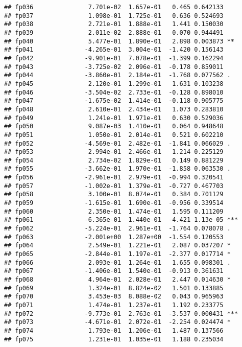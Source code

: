 \documentclass[
]{article}
\begin{document}
\begin{verbatim}
## fp036               7.701e-02  1.657e-01   0.465 0.642133    
## fp037               1.098e-01  1.725e-01   0.636 0.524693    
## fp038               2.721e-01  1.888e-01   1.441 0.150030    
## fp039               2.011e-02  2.888e-01   0.070 0.944491    
## fp040               5.477e-01  1.890e-01   2.898 0.003873 ** 
## fp041              -4.265e-01  3.004e-01  -1.420 0.156143    
## fp042              -9.901e-01  7.078e-01  -1.399 0.162294    
## fp043              -3.725e-02  2.096e-01  -0.178 0.859011    
## fp044              -3.860e-01  2.184e-01  -1.768 0.077562 .  
## fp045               2.120e-01  1.299e-01   1.631 0.103238    
## fp046              -3.504e-02  2.733e-01  -0.128 0.898010    
## fp047              -1.675e-02  1.414e-01  -0.118 0.905775    
## fp048               2.610e-01  2.434e-01   1.073 0.283810    
## fp049               1.241e-01  1.971e-01   0.630 0.529036    
## fp050               9.087e-03  1.410e-01   0.064 0.948648    
## fp051               1.050e-01  2.014e-01   0.521 0.602210    
## fp052              -4.569e-01  2.482e-01  -1.841 0.066029 .  
## fp053               2.994e-01  2.466e-01   1.214 0.225129    
## fp054               2.734e-02  1.829e-01   0.149 0.881229    
## fp055              -3.662e-01  1.970e-01  -1.858 0.063530 .  
## fp056              -2.961e-01  2.979e-01  -0.994 0.320541    
## fp057              -1.002e-01  1.379e-01  -0.727 0.467703    
## fp058               3.100e-01  8.074e-01   0.384 0.701129    
## fp059              -1.615e-01  1.690e-01  -0.956 0.339514    
## fp060               2.350e-01  1.474e-01   1.595 0.111209    
## fp061              -6.365e-01  1.440e-01  -4.421 1.13e-05 ***
## fp062              -5.224e-01  2.961e-01  -1.764 0.078078 .  
## fp063              -2.001e+00  1.287e+00  -1.554 0.120553    
## fp064               2.549e-01  1.221e-01   2.087 0.037207 *  
## fp065              -2.844e-01  1.197e-01  -2.377 0.017714 *  
## fp066               2.093e-01  1.264e-01   1.655 0.098301 .  
## fp067              -1.406e-01  1.540e-01  -0.913 0.361631    
## fp068               4.964e-01  2.028e-01   2.447 0.014630 *  
## fp069               1.324e-01  8.824e-02   1.501 0.133885    
## fp070               3.453e-03  8.088e-02   0.043 0.965963    
## fp071               1.474e-01  1.237e-01   1.192 0.233775    
## fp072              -9.773e-01  2.763e-01  -3.537 0.000431 ***
## fp073              -4.671e-01  2.072e-01  -2.254 0.024474 *  
## fp074               1.793e-01  1.206e-01   1.487 0.137566    
## fp075               1.231e-01  1.035e-01   1.188 0.235034    

\end{verbatim}
\end{document}
